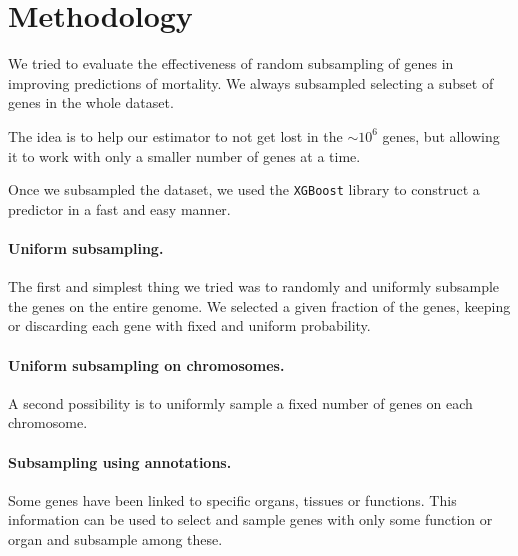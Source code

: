 \section{Methodology}
\label{sec:methods}

We tried to evaluate the effectiveness of random subsampling of genes in improving predictions of mortality.
We always subsampled selecting a subset of genes in the whole dataset.

The idea is to help our estimator to not get lost in the $\sim 10^6$ genes, but allowing it to work with only a smaller number of genes at a time.

Once we subsampled the dataset,  we used the \texttt{XGBoost}\cite{xgboost} library to construct a predictor in a fast and easy manner. 

\paragraph{Uniform subsampling.}
The first and simplest thing we tried was to randomly and uniformly subsample the genes on the entire genome.
We selected a given fraction of the genes, keeping or discarding each gene with fixed and uniform probability.

\paragraph{Uniform subsampling on chromosomes.}
A second possibility is to uniformly sample a fixed number of genes on each chromosome.

\paragraph{Subsampling using annotations.}
Some genes have been linked to specific organs, tissues or functions. This information can be used to select and sample genes with only some function or organ and subsample among these.
